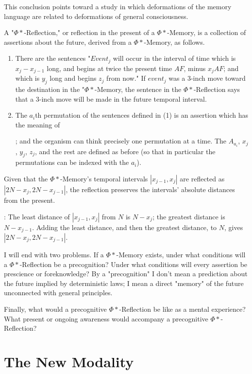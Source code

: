 \documentclass[10pt,twoside,draft]{memoir}
\newcommand{\speech}[1]{
	\textquote{\emph{#1}}}
\newcommand{\said}[1]{ %
	\speech{#1}}
\begin{document}
{{This conclusion points toward a study in which deformations of the 
memory language are related to deformations of general consciousness. 

 A "$\Phi*$-Reflection," or reflection in the present of a 
$\Phi*$-Memory, is a collection of assertions about the future, derived from a 
$\Phi*$-Memory, as follows. 
\begin{enumerate}
	\item There are the sentences "$Event_j$ will occur in the 
interval of time which is $x_j-x_{j-1}$ long, and begins at twice the present time 
$AF$, minus $x_j AF$; and which is $y_j$ long and begins $z_j$ from now." If $event_j$ was 
a 3-inch move toward the destination in the "$\Phi*$-Memory, the sentence in the 
$\Phi*$-Reflection says that a 3-inch move will be made in the future temporal 
interval. 
	\item The $a_i$th permutation of the sentences defined in (1) is an 
assertion which has the meaning of \said{I will do $A_{a_i}$}; and the organism can 
think precisely one permutation at a time. The $A_{a_i}$, $x_j$, $y_j$, $z_j$, and the rest are 
defined as before (so that in particular the permutations can be indexed with 
the $a_i$). 
\end{enumerate}

 Given that the $\Phi*$-Memory's temporal intervals $|x_{j-1}, x_j|$
are reflected as $|2N-x_j, 2N-x_{j-1}|$, the reflection preserves the intervals' 
absolute distances from the present. 

\proof: The least distance of $|x_{j-1}, x_j|$
from $N$ is $N-x_j$; the greatest distance is $N-x_{j-1}$. Adding the least distance, and 
then the greatest distance, to $N$, gives $|2N-x_j, 2N-x_{j-1}|$.

I will end with two problems. If a $\Phi*$-Memory exists, under what 
conditions will a $\Phi*$-Reflection be a precognition? Under what conditions 
will every assertion be prescience or foreknowledge? By a "precognition" I 
don't mean a prediction about the future implied by deterministic laws; I 
mean a direct "memory" of the future unconnected with general principles. 

Finally, what would a precognitive $\Phi*$-Reflection be like as a mental 
experience? What present or ongoing awareness would accompany a 
precognitive $\Phi*$-Reflection? 

\part{The New Modality}

}}
\end{document}
